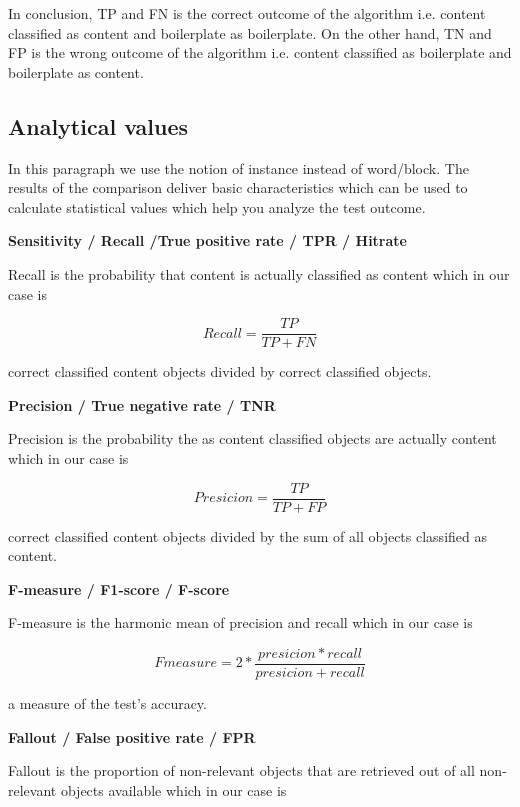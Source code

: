 In conclusion, TP and FN is the correct outcome of the algorithm i.e. content classified as content and boilerplate as boilerplate. On the other hand, TN and FP is the wrong outcome of the algorithm i.e. content classified as boilerplate and boilerplate as content.



\subsection{Analytical values}
\label{subsec:Analytical values}

In this paragraph we use the notion of instance instead of word/block.
The results of the comparison deliver basic characteristics which can be used to calculate statistical values which help you analyze the test outcome.
										
\textbf{ Sensitivity / Recall /True positive rate / TPR / Hitrate }

Recall is the probability that content is actually classified as content which in our case is

\begin{equation}
 Recall =\frac{TP}{TP + FN}
\end{equation}

correct classified content objects divided by correct classified objects.

\textbf{Precision / True negative rate / TNR} 


Precision is the probability the as content classified objects are actually content which in our case is

\begin{equation}
 Presicion = \frac{TP}{TP + FP}
\end{equation}

correct classified content objects divided by the sum of all objects classified as content.

\textbf{F-measure / F1-score / F-score} 

F-measure is the harmonic mean of precision and recall which in our case is

\begin{equation}
Fmeasure =  2* \frac{presicion * recall}{presicion + recall}
\end{equation}

a measure of the test's accuracy.



\textbf{Fallout / False positive rate / FPR}

Fallout is the proportion of non-relevant objects that are retrieved out of all non-relevant objects available which in our case is

